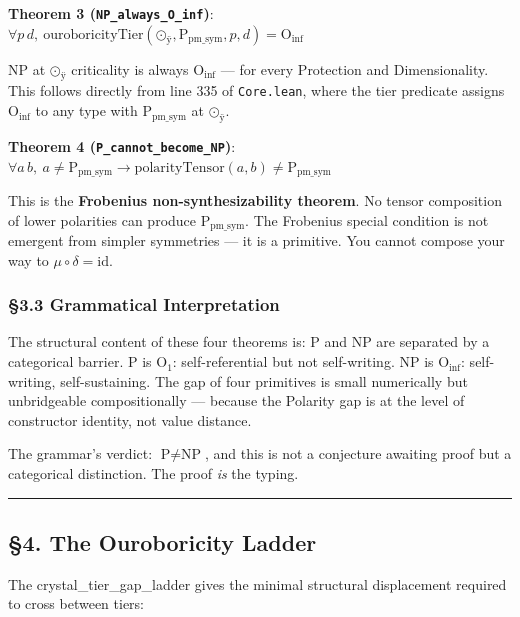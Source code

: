 \documentclass[12pt,a4paper]{article}
\newcommand{\pilcrow}{\S}
\begin{document}
\textbf{Theorem 3 (\texttt{NP\_always\_O\_inf})}: $\forall p\, d,\ \text{ouroboricityTier}(\text{⊙}_{\text{ÿ}}, \text{P}_{\text{pm\_sym}}, p, d) = \text{O}_{\text{inf}}$

NP at $\text{⊙}_{\text{ÿ}}$ criticality is always $\text{O}_{\text{inf}}$ --- for every Protection and Dimensionality. This follows directly from line 335 of \texttt{Core.lean}, where the tier predicate assigns $\text{O}_{\text{inf}}$ to any type with $\text{P}_{\text{pm\_sym}}$ at $\text{⊙}_{\text{ÿ}}$.

\textbf{Theorem 4 (\texttt{P\_cannot\_become\_NP})}: $\forall a\, b,\ a \neq \text{P}_{\text{pm\_sym}} \rightarrow \text{polarityTensor}(a, b) \neq \text{P}_{\text{pm\_sym}}$

This is the \textbf{Frobenius non-synthesizability theorem}. No tensor composition of lower polarities can produce $\text{P}_{\text{pm\_sym}}$. The Frobenius special condition is not emergent from simpler symmetries --- it is a primitive. You cannot compose your way to $\mu \circ \delta = \text{id}$.

\subsubsection{\pilcrow{}3.3 Grammatical Interpretation}

The structural content of these four theorems is: P and NP are separated by a categorical barrier. P is $\text{O}_{\text{1}}$: self-referential but not self-writing. NP is $\text{O}_{\text{inf}}$: self-writing, self-sustaining. The gap of four primitives is small numerically but unbridgeable compositionally --- because the Polarity gap is at the level of constructor identity, not value distance.

The grammar's verdict: $\text{P} \neq \text{NP}$, and this is not a conjecture awaiting proof but a categorical distinction. The proof \emph{is} the typing.

\begin{center}
\rule{0.5\textwidth}{0.4pt}
\end{center}

\subsection{\pilcrow{}4. The Ouroboricity Ladder}

The crystal\_tier\_gap\_ladder gives the minimal structural displacement required to cross between tiers:
\end{document}
